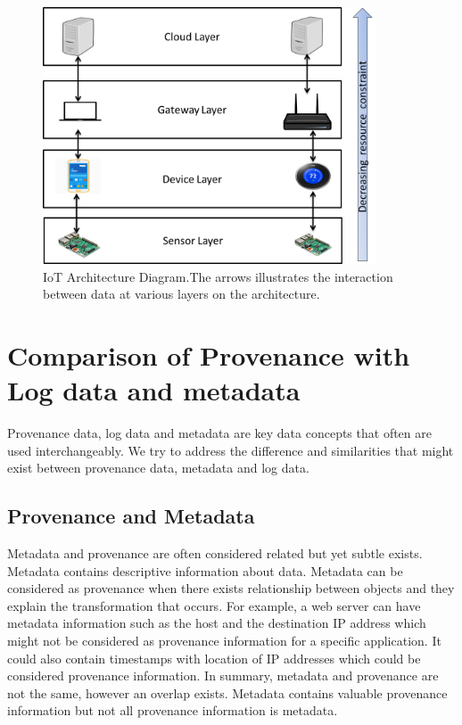 \begin{figure}[h]
\begin{center}

\includegraphics[height=3.0in]{iot_architecture.png}
\end{center}
\caption{IoT Architecture Diagram.The arrows illustrates the interaction between data at various layers on the architecture.}
\label{iot_architecture}

\end{figure}



\section{Comparison of Provenance with Log data and metadata}

Provenance data, log data and metadata are key data concepts that often are used interchangeably. We try to address the difference and similarities that might exist between provenance data, metadata and log data.

\subsection{Provenance and Metadata}
Metadata and provenance are often considered related but yet subtle exists. Metadata contains descriptive information about data. Metadata can be considered as provenance when there exists relationship between objects and they explain the transformation that occurs. For example, a web server can have metadata information such as the host and the destination IP address which might not be considered as provenance information for a specific application. It could also contain timestamps with location of IP addresses which could be considered provenance information. In summary,  metadata and provenance are not the same, however an overlap exists. Metadata contains valuable  provenance information but not all provenance information is metadata. 


